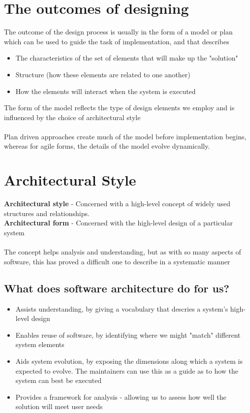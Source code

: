 \documentclass{article}[18pt]
\begin{document}
\section{The outcomes of designing}
The outcome of the design process is usually in the form of a model or plan which can be used to guide the task of implementation, and that describes
\begin{itemize}
	\item The characteristics of the set of elements that will make up the "solution"
	\item Structure (how these elements are related to one another)
	\item How the elements will interact when the system is executed
\end{itemize}
The form of the model reflects the type of design elements we employ and is influenced by the choice of architectural style\\
\\
Plan driven approaches create much of the model before implementation begins, whereas for agile forms, the details of the model evolve dynamically.
\section{Architectural Style}
\textbf{Architectural style} - Concerned with a high-level concept of widely used structures and relationships.\\
\textbf{Architectural form} - Concerned with the high-level design of a particular system\\
\\
The concept helps analysis and understanding, but as with so many aspects of software, this has proved a difficult one to describe in a systematic manner
\subsection{What does software architecture do for us?}
\begin{itemize}
	\item Assists understanding, by giving a vocabulary that descries a system's high-level design
	\item Enables reuse of software, by identifying where we might "match" different system elements
	\item Aids system evolution, by exposing the dimensions along which a system is expected to evolve. The maintainers can use this as a guide as to how the system can best be executed
	\item Provides a framework for analysis - allowing us to assess how well the solution will meet user needs
\end{itemize}
\end{document}
